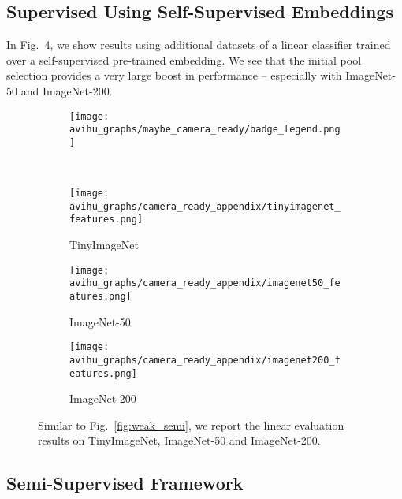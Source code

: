 \documentclass{article}
\begin{document}
\subsection{Supervised Using Self-Supervised Embeddings}

In Fig.~\ref{fig:app_linear_more}, we show results using additional datasets of a linear classifier trained over a self-supervised pre-trained embedding. We see that the initial pool selection provides a very large boost in performance -- especially with ImageNet-50 and ImageNet-200.  

\label{app:more_lin_empirical}
\begin{figure}[thb!]
\begin{center}
\begin{subfigure}{.45\textwidth}
  \centering
 \texttt{[image: avihu\_graphs/maybe\_camera\_ready/badge\_legend.png]}
\end{subfigure}
\\
    \begin{subfigure}{.157\textwidth}
      \centering
      \texttt{[image: avihu\_graphs/camera\_ready\_appendix/tinyimagenet\_features.png]}
\caption{TinyImageNet}
    \label{fig:app_linear_more_tinyimagenet}
    \end{subfigure}
    \begin{subfigure}{.157\textwidth}
      \centering
      \texttt{[image: avihu\_graphs/camera\_ready\_appendix/imagenet50\_features.png]}
\caption{ImageNet-50}
    \label{fig:app_linear_more_imagenet50}
    \end{subfigure}
    \begin{subfigure}{.157\textwidth}
      \centering
      \texttt{[image: avihu\_graphs/camera\_ready\_appendix/imagenet200\_features.png]}
\caption{ImageNet-200}
    \label{fig:app_linear_more_imagenet100}
    \end{subfigure}
\caption{Similar to Fig.~\ref{fig:weak_semi}, we report the linear evaluation results on TinyImageNet, ImageNet-50 and ImageNet-200.}
\label{fig:app_linear_more}
\end{center}
\vspace{-.6cm}
\end{figure}



\subsection{Semi-Supervised Framework}
\label{app:more_ssl_empirical}
\end{document}
